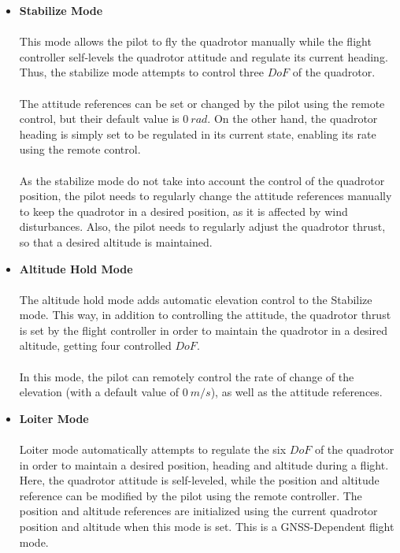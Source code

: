\begin{itemize}
\item \textbf{Stabilize Mode}\\\\
This mode allows the pilot to fly the quadrotor manually while the flight controller self-levels the quadrotor attitude and regulate its current heading. Thus, the stabilize mode attempts to control three $DoF$ of the quadrotor.\\\\
The attitude references can be set or changed by the pilot using the remote control, but their default value is $0\ rad$. On the other hand, the quadrotor heading is simply set to be regulated in its current state, enabling its rate using the remote control.
\\\\
As the stabilize mode do not take into account the control of the quadrotor position, the pilot needs to regularly change the attitude references manually to keep the quadrotor in a desired position, as it is affected by wind disturbances. Also, the pilot needs to regularly adjust the quadrotor thrust, so that a desired altitude is maintained.

\item \textbf{Altitude Hold Mode}\\\\
The altitude hold mode adds automatic elevation control to the Stabilize mode. This way, in addition to controlling the attitude, the quadrotor thrust is set by the flight controller in order to maintain the quadrotor in a desired altitude, getting four controlled $DoF$.
\\\\
In this mode, the pilot can remotely control the rate of change of the elevation (with a default value of $0\ m/s$), as well as the attitude references.

\item \textbf{Loiter Mode}\\\\
Loiter mode automatically attempts to regulate the six $DoF$ of the quadrotor in order to maintain a desired position, heading and altitude during a flight. Here, the quadrotor attitude is self-leveled, while the position and altitude reference can be modified by the pilot using the remote controller. The position and altitude references are initialized using the current quadrotor position and altitude when this mode is set. This is a GNSS-Dependent flight mode.


\end{itemize}
